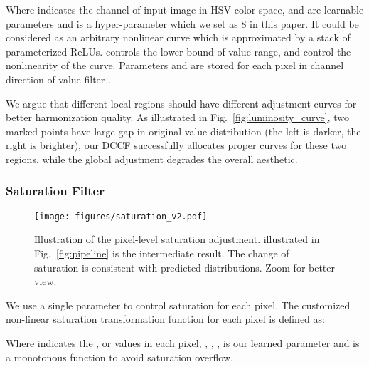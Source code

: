 \documentclass[runningheads]{llncs}
\begin{document}
    
    
    Where  indicates the  channel of input image in HSV color space,   and  are learnable parameters and  is a hyper-parameter which we set as 8 in this paper.
    It could be considered as an arbitrary nonlinear curve which is approximated by a stack of parameterized ReLUs.
     controls the lower-bound of value range,  and  control the nonlinearity of the curve.
    Parameters  and  are stored for each pixel in channel direction of value filter .
    


    We argue that different local regions should have different adjustment curves for better harmonization quality.
    As illustrated in Fig.~\ref{fig:luminosity_curve}, two marked points have large gap in original value distribution (the left is darker, the right is brighter), our DCCF  successfully allocates proper curves for these two regions, while the global adjustment degrades the overall aesthetic.
    


    
\subsubsection{Saturation Filter} 
    
    \begin{figure}[!thb]
        \centering
        \vspace{-30pt}
        \texttt{[image: figures/saturation\_v2.pdf]}\\
        \caption{
            \small Illustration of the pixel-level saturation adjustment. 
             illustrated in Fig.~\ref{fig:pipeline} is the intermediate result. The change of saturation is consistent with predicted  distributions. Zoom for better view.
            }
        \vspace{-15pt}
        \label{fig:saturation_map}
    \end{figure}
    
    


    We use a single parameter  to control saturation for each pixel.
    The customized non-linear saturation transformation function  for each pixel is defined as:
    
    
      
    Where  indicates the ,  or  values in each pixel, , , ,
     is our learned parameter and  is a monotonous function to avoid saturation overflow.
    
\end{document}
